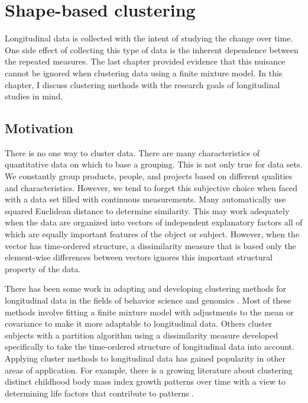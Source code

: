\chapter{Shape-based clustering}
\label{chap:motivate}

Longitudinal data is collected with the intent of studying the change over time. One side effect of collecting this type of data is the inherent dependence between the repeated measures. The last chapter provided evidence that this nuisance cannot be ignored when clustering data using a finite mixture model. In this chapter, I discuss clustering methods with the research goals of longitudinal studies in mind. 

\section{Motivation}
There is no one way to cluster data. There are many characteristics of quantitative data on which to base a grouping. This is not only true for data sets. We constantly group products, people, and projects based on different qualities and characteristics. However, we tend to forget this subjective choice when faced with a data set filled with continuous measurements. Many automatically use squared Euclidean distance to determine similarity. This may work adequately when the data are organized into vectors of independent explanatory factors all of which are equally important features of the object or subject. However, when the vector has time-ordered structure, a dissimilarity measure that is based only the element-wise differences between vectors ignores this important structural property of the data.  

There has been some work in adapting and developing clustering methods for longitudinal data in the fields of behavior science and genomics \cite{schneiderman1993,genolini2010, jones2001, muthen2010, mcnicholas2010}. Most of these methods involve fitting a finite mixture model with adjustments to the mean or covariance to make it more adaptable to longitudinal data. Others cluster subjects with a partition algorithm using a dissimilarity measure developed specifically to take the time-ordered structure of longitudinal data into account. Applying cluster methods to longitudinal data has gained popularity in other areas of application. For example, there is a growing literature about clustering distinct childhood body mass index growth patterns over time with a view to determining life factors that contribute to patterns \cite{pryor2011,carter2012}. 

